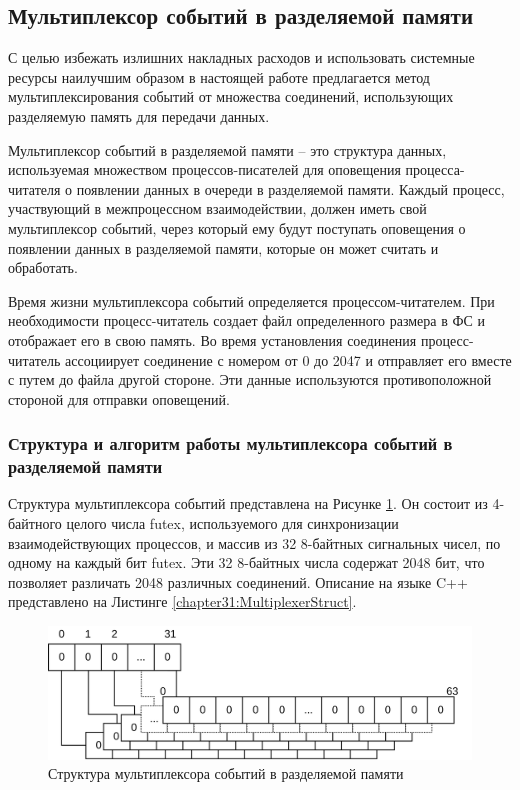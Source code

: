 \subsection{Мультиплексор событий в разделяемой памяти}\label{chapter31:Mux}

С целью избежать излишних накладных расходов и использовать системные ресурсы наилучшим образом в настоящей работе предлагается метод мультиплексирования событий от множества соединений, использующих разделяемую память для передачи данных.

Мультиплексор событий в разделяемой памяти -- это структура данных, используемая множеством процессов-писателей для оповещения процесса-читателя о появлении данных в очереди в разделяемой памяти. Каждый процесс, участвующий в межпроцессном взаимодействии, должен иметь свой мультиплексор событий, через который ему будут поступать оповещения о появлении данных в разделяемой памяти, которые он может считать и обработать.

Время жизни мультиплексора событий определяется процессом-читателем. При необходимости процесс-читатель создает файл определенного размера в ФС и отображает его в свою память. Во время установления соединения процесс-читатель ассоциирует соединение с номером от 0 до 2047 и отправляет его вместе с путем до файла другой стороне. Эти данные используются противоположной стороной для отправки оповещений.


\subsubsection{Структура и алгоритм работы мультиплексора событий в разделяемой памяти}\label{chapter31:MuxStructure}

Структура мультиплексора событий представлена на Рисунке \ref{chapter31:MuxZeroState}. Он состоит из 4-байтного целого числа futex, используемого для синхронизации взаимодействующих процессов, и массив из 32 8-байтных сигнальных чисел, по одному на каждый бит futex. Эти 32 8-байтных числа содержат 2048 бит, что позволяет различать 2048 различных соединений. Описание на языке C++ представлено на Листинге \ref{chapter31:MultiplexerStruct}.


\begin{figure}[!h]
\caption{Структура мультиплексора событий в разделяемой памяти}
\label{chapter31:MuxZeroState}
\includegraphics[width=\textwidth]{../../graphics/schemes/futex}
\end{figure}

